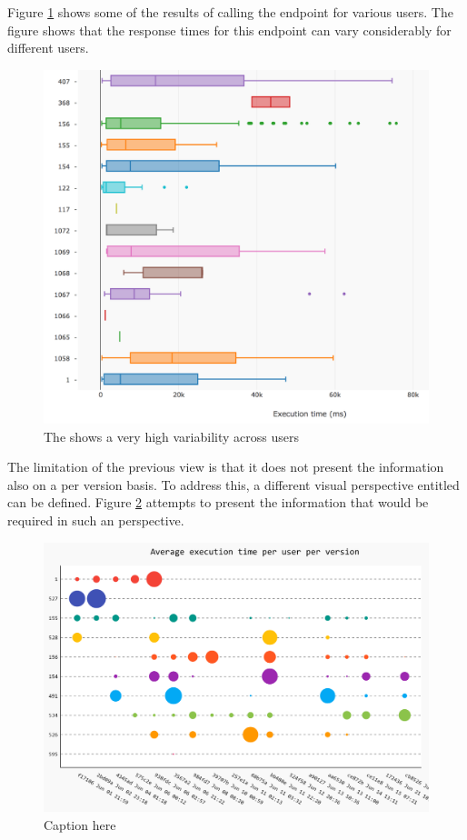 \documentclass[conference]{IEEEtran}
\begin{document}
  Figure \ref{fig:tpu} shows some of the results of calling the \epFeedItems endpoint for various users. The figure shows that the response times for this endpoint can vary considerably for different users. 

  \begin{figure}[!ht]
    \centering
    \includegraphics[width=\linewidth]{time_per_user}
    \caption{The \epFeedItems shows a very high variability across users}
    \label{fig:tpu}
  \end{figure}

  \niceseparator

  The limitation of the previous view is that it does not present the information also on a per version basis. To address this, a different visual perspective entitled  can be defined. Figure \ref{fig:tuv} attempts to present the information that would be required in such an perspective. 

  \begin{figure}[!ht]
    \centering
    \includegraphics[width=\linewidth]{time_per_user_per_version}
    \caption{Caption here}
    \label{fig:tuv}
  \end{figure}
\end{document}
